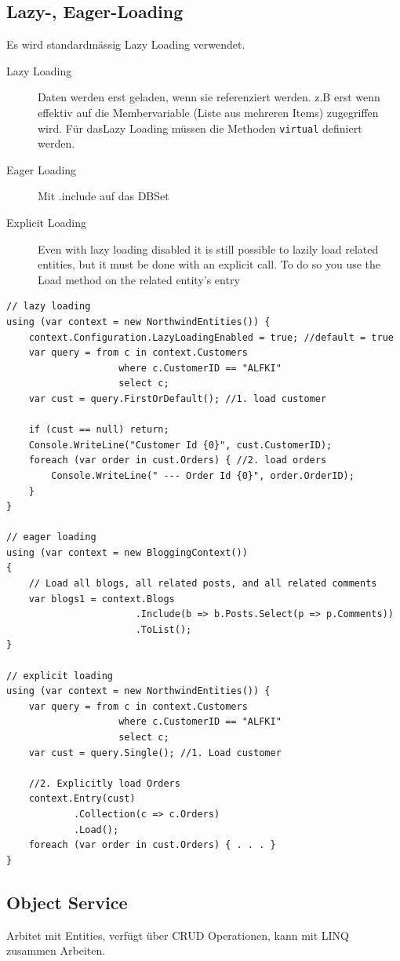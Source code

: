 \documentclass[
a4paper,
oneside,
10pt,
fleqn,
headsepline,
toc=listofnumbered, 
bibliography=totocnumbered]{scrartcl}
\begin{document}
\subsection{Lazy-, Eager-Loading}
Es wird standardmässig Lazy Loading verwendet. 
\begin{description}
	\item[Lazy Loading] Daten werden erst geladen, wenn sie referenziert werden. z.B erst wenn effektiv auf die Membervariable (Liste aus mehreren Items) zugegriffen wird. Für dasLazy Loading müssen die Methoden \lstinline|virtual| definiert werden. 
	\item[Eager Loading] Mit .include auf das DBSet
	\item[Explicit Loading] Even with lazy loading disabled it is still possible to lazily load related entities, but it must be done with an explicit call. To do so you use the Load method on the related entity’s entry
\end{description}
\begin{lstlisting}
// lazy loading
using (var context = new NorthwindEntities()) {
	context.Configuration.LazyLoadingEnabled = true; //default = true
	var query = from c in context.Customers
					where c.CustomerID == "ALFKI"
					select c;
	var cust = query.FirstOrDefault(); //1. load customer 

	if (cust == null) return;
	Console.WriteLine("Customer Id {0}", cust.CustomerID);
	foreach (var order in cust.Orders) { //2. load orders
		Console.WriteLine("	--- Order Id {0}", order.OrderID);
	}
}

// eager loading
using (var context = new BloggingContext()) 
{ 
    // Load all blogs, all related posts, and all related comments 
    var blogs1 = context.Blogs 
                       .Include(b => b.Posts.Select(p => p.Comments)) 
                       .ToList(); 
}

// explicit loading
using (var context = new NorthwindEntities()) {
	var query = from c in context.Customers
					where c.CustomerID == "ALFKI"
					select c;
	var cust = query.Single(); //1. Load customer
	
	//2. Explicitly load Orders
	context.Entry(cust)
			.Collection(c => c.Orders)
			.Load();
	foreach (var order in cust.Orders) { . . . }
}
\end{lstlisting}

\subsection{Object Service}
Arbitet mit Entities, verfügt über CRUD Operationen, kann mit LINQ zusammen Arbeiten. 
\end{document}
